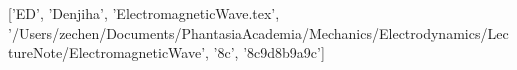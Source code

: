 ['ED', 'Denjiha', 'ElectromagneticWave.tex', '/Users/zechen/Documents/PhantasiaAcademia/Mechanics/Electrodynamics/LectureNote/ElectromagneticWave', '\x8c\xaf{}', '\xaf\xbc{}\xbd{}\xbe{}\x8c\x9d\xbb{}\x8b\x9a\x9c\xba']
